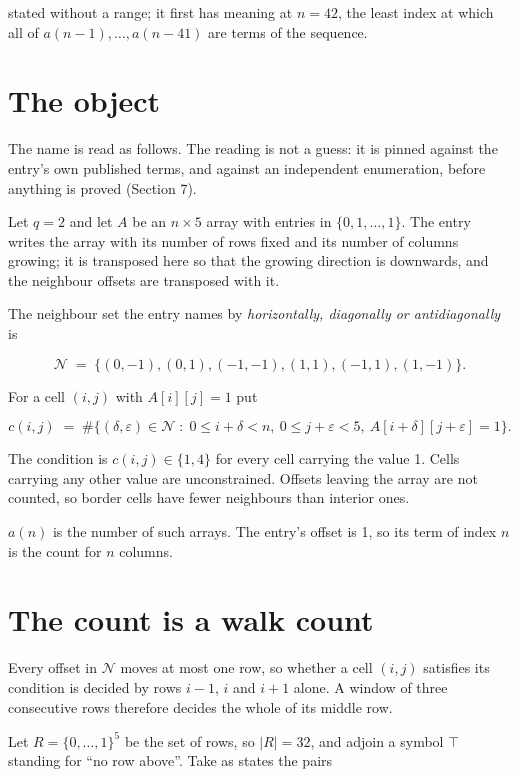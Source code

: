 \documentclass[11pt]{article}
\theoremstyle{definition}
\begin{document}
stated without a range; it first has meaning at $n = 42$, the least index at which all of $a(n-1),\dots,a(n-41)$ are terms of the sequence.

\section{The object}

The name is read as follows. The reading is not a guess: it is pinned against the entry's own published terms, and against an independent enumeration, before anything is proved (Section 7).

Let $q = 2$ and let $A$ be an $n \times 5$ array with entries in $\{0,1,\dots,1\}$. The entry writes the array with its number of rows fixed and its number of columns growing; it is transposed here so that the growing direction is downwards, and the neighbour offsets are transposed with it.

The neighbour set the entry names by {\itshape horizontally, diagonally or antidiagonally} is

\[\mathcal{N} \;=\; \{(0,-1), (0,1), (-1,-1), (1,1), (-1,1), (1,-1)\}.\]

For a cell $(i,j)$ with $A[i][j] = 1$ put

\[c(i,j) \;=\; \#\bigl\{(\delta,\varepsilon)\in\mathcal{N} \;:\; 0\le i+\delta<n,\ 0\le j+\varepsilon<5,\ A[i+\delta][j+\varepsilon] = 1\bigr\}.\]

The condition is $c(i,j) \in \{1, 4\}$ for every cell carrying the value 1. Cells carrying any other value are unconstrained. Offsets leaving the array are not counted, so border cells have fewer neighbours than interior ones.

$a(n)$ is the number of such arrays. The entry's offset is 1, so its term of index $n$ is the count for $n$ columns.

\section{The count is a walk count}

Every offset in $\mathcal{N}$ moves at most one row, so whether a cell $(i,j)$ satisfies its condition is decided by rows $i-1$, $i$ and $i+1$ alone. A window of three consecutive rows therefore decides the whole of its middle row.

Let $R = \{0,\dots,1\}^{5}$ be the set of rows, so $|R| = 32$, and adjoin a symbol $\top$ standing for ``no row above''. Take as states the pairs
\end{document}
